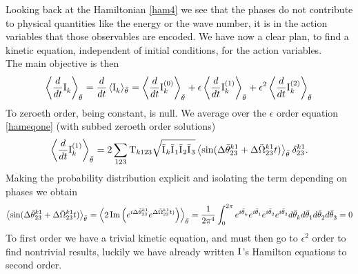Looking back at the Hamiltonian \eqref{ham4} we see that the phases do not contribute to physical quantities like the energy or the wave number, 
it is in the action variables that those observables are encoded. We have now a clear plan, to find a kinetic equation, independent of initial conditions, for
the action variables. \\
The main objective is then
\begin{equation}
    \left\langle \frac{d}{dt} \mathrm{I}^{}_k \right\rangle_{\bar{\theta}^{}} = \frac{d}{dt} \left\langle \mathrm{I}^{}_k \right\rangle_{\bar{\theta}^{}} = \left\langle \frac{d}{dt} \mathrm{I}^{(0)}_k \right\rangle_{\bar{\theta}^{}}+
    \epsilon\left\langle \frac{d}{dt} \mathrm{I}^{(1)}_k \right\rangle_{\bar{\theta}^{}} + \epsilon^2\left\langle \frac{d}{dt} \mathrm{I}^{(2)}_k \right\rangle_{\bar{\theta}^{}} 
    \label{kineticexp}
\end{equation}
To zeroeth order, being constant, is null. We average over the $\epsilon$ order equation \eqref{hameqone} (with subbed zeroeth order solutions)
\begin{equation}
    \left\langle \frac{d}{dt} \mathrm{I}^{(1)}_k \right\rangle_{\bar{\theta}^{}} = 2\sum_{123} \mathrm{T}_{k123} \sqrt{\bar{\mathrm{I}^{}}_k\bar{\mathrm{I}^{}}_1\bar{\mathrm{I}^{}}_2\bar{\mathrm{I}^{}}_3} \left\langle\sin(\Delta\bar{\theta}^{k1}_{23} +
    \Delta\bar{\Omega}^{k1}_{23}t)\right\rangle_{\bar{\theta}^{}}\delta^{k1}_{23}.
\end{equation}
Making the probability distribution explicit and isolating the term depending on phases we obtain
\begin{multline}
    \left\langle\sin(\Delta\bar{\theta}^{k1}_{23} + \Delta\bar{\Omega}^{k1}_{23}t)\right\rangle_{\bar{\theta}^{}} = 
    \left\langle 2 \operatorname{Im}\left(e^{i\Delta\bar{\theta}^{k1}_{23}}e^{\Delta\bar{\Omega}^{k1}_{23}t)} \right)   \right\rangle_{\bar{\theta}^{}} = 
    \frac{1}{2\pi^4}\int_{0}^{2\pi}  e^{i\bar{\theta}^{}_k}e^{i\bar{\theta}^{}_1}e^{i\bar{\theta}^{}_2}e^{i\bar{\theta}^{}_3} d \bar{\theta}^{}_k d \bar{\theta}^{}_1 d \bar{\theta}^{}_2 d \bar{\theta}^{}_3 = 0
\end{multline}
To first order we have a trivial kinetic equation, and must then go to $\epsilon^2$ order to find nontrivial results, luckily we have already written $\mathrm{I}^{}$'s 
Hamilton equations to second order. \\

